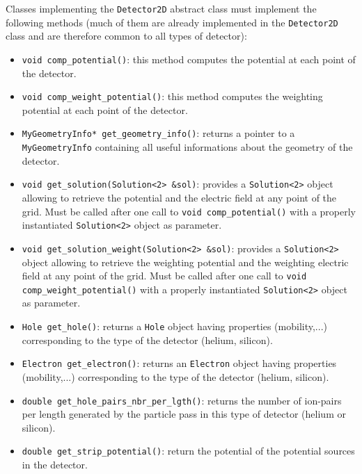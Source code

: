 \documentclass[11pt]{article}
\begin{document}
\newpage
		Classes	implementing the \texttt{Detector2D} abstract class must implement the
		following methods (much of them are already implemented in the \texttt{Detector2D}
		class and are therefore common to all types of detector):
		\begin{itemize}
			\item \lstinline{void comp_potential()}: this method computes the potential
			at each point of the detector.
			\item \lstinline{void comp_weight_potential()}: this method computes the
			weighting potential	at each point of the detector.
			\item \lstinline{MyGeometryInfo* get_geometry_info()}: returns a pointer
			to a \lstinline{MyGeometryInfo} containing all useful informations about the geometry
			of the detector.

			\item \lstinline{void get_solution(Solution<2> &sol)}: provides
			a \lstinline{Solution<2>} object allowing to retrieve the potential
			and the electric field at any point of the grid. Must be called
			after one call to \lstinline{void comp_potential()} with a properly instantiated
			\lstinline{Solution<2>} object as parameter.

			\item \lstinline{void get_solution_weight(Solution<2> &sol)}: provides
			a \lstinline{Solution<2>} object allowing to retrieve the weighting potential
			and the weighting electric field at any point of the grid. Must be called
			after one call to \lstinline{void comp_weight_potential()} with a properly instantiated
			\lstinline{Solution<2>} object as parameter.

			\item \lstinline{Hole get_hole()}: returns a \texttt{Hole} object having
			properties (mobility,...) corresponding to the type of the detector (helium, silicon).

			\item \lstinline{Electron get_electron()}: returns an \texttt{Electron} object having
			properties (mobility,...) corresponding to the type of the detector (helium, silicon).

			\item \lstinline{double get_hole_pairs_nbr_per_lgth()}: returns the number
			of ion-pairs per length generated by the particle pass in this
			type of detector (helium or silicon).

			\item \lstinline{double get_strip_potential()}: return the potential of
			the potential sources in the detector.


\end{itemize}
\end{document}
